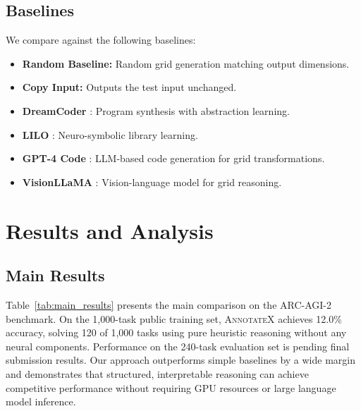 \documentclass[conference,10pt,letterpaper]{IEEEtran}
\newcommand{\annotatexname}{\textsc{AnnotateX}}
\begin{document}
\subsection{Baselines}

We compare against the following baselines:
\begin{itemize}[leftmargin=*,nosep]
    \item \textbf{Random Baseline:} Random grid generation matching output dimensions.
    \item \textbf{Copy Input:} Outputs the test input unchanged.
    \item \textbf{DreamCoder} \cite{ellis2021dreamcoder}: Program synthesis with abstraction learning.
    \item \textbf{LILO} \cite{valmeekam2023lilo}: Neuro-symbolic library learning.
    \item \textbf{GPT-4 Code} \cite{gc3732024}: LLM-based code generation for grid transformations.
    \item \textbf{VisionLLaMA} \cite{zhang2024visual}: Vision-language model for grid reasoning.
\end{itemize}

\section{Results and Analysis}
\label{sec:results}

\subsection{Main Results}

Table~\ref{tab:main_results} presents the main comparison on the ARC-AGI-2 benchmark. On the 1,000-task public training set, \annotatexname{} achieves 12.0\% accuracy, solving 120 of 1,000 tasks using pure heuristic reasoning without any neural components. Performance on the 240-task evaluation set is pending final submission results. Our approach outperforms simple baselines by a wide margin and demonstrates that structured, interpretable reasoning can achieve competitive performance without requiring GPU resources or large language model inference.
\end{document}
